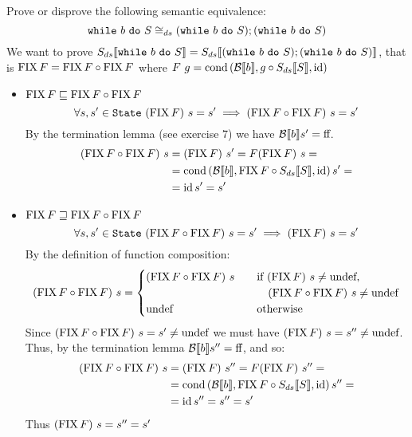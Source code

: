 \begin{exercise}{
    Prove or disprove the following semantic equivalence:
    \[ \wwhile{b}{S} \cong_{ds} (\wwhile{b}{S});(\wwhile{b}{S}) \]
}
    We want to prove $\Sds{\wwhile{b}{S}} = \Sds{(\wwhile{b}{S});(\wwhile{b}{S})}$, that is $\FIX F = \FIX F \circ \FIX F$ where $F\ g = \cond{\Bool{b}}{g \circ \Sds{S}}{\id}$
    \begin{itemize}
        \item $\FIX F \sqsubseteq \FIX F \circ \FIX F$
            \[ \forall s, s' \in \texttt{State}\ (\FIX F)\ s = s' \implies (\FIX F \circ \FIX F)\ s = s' \]
            By the termination lemma (see exercise 7) we have $\Bool{b} s' = \text{ff}$.
            \begin{align*}
                (\FIX F \circ \FIX F)\ s &= (\FIX F)\ s' = F(\FIX F)\ s = \\
                &= \cond{\Bool{b}}{\FIX F \circ \Sds{S}}{\id} s' = \\
                &= \id s' = s'
            \end{align*}
        \item $\FIX F \sqsupseteq \FIX F \circ \FIX F$
            \[ \forall s, s' \in \texttt{State}\ (\FIX F \circ \FIX F)\ s = s' \implies (\FIX F)\ s = s' \]
            By the definition of function composition:
            \[
                (\FIX F \circ \FIX F)\ s = \begin{cases}
                    (\FIX F \circ \FIX F)\ s &\quad \text{if } (\FIX F)\ s \neq \undef, \\
                        &\quad\quad (\FIX F \circ \FIX F)\ s \neq \undef \\
                    \undef &\quad \text{otherwise}
                \end{cases}
            \]
            Since $(\FIX F \circ \FIX F)\ s = s' \neq \undef$ we must have $(\FIX F)\ s = s'' \neq \undef$. Thus, by the termination lemma $\Bool{b} s'' = \text{ff}$, and so:
            \begin{align*}
                (\FIX F \circ \FIX F)\ s &= (\FIX F)\ s'' = F(\FIX F)\ s'' = \\
                &= \cond{\Bool{b}}{\FIX F \circ \Sds{S}}{\id} s'' = \\
                &= \id s'' = s'' = s'
            \end{align*}
            Thus $(\FIX F)\ s = s'' = s'$
    \end{itemize}
\end{exercise}
